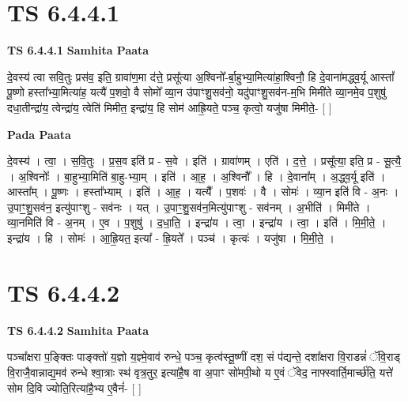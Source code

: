 \documentclass[17pt]{extarticle}
\begin{document}
\section*{ TS 6.4.4.1 }

\textbf{TS 6.4.4.1 } \newline
\textbf{Samhita Paata} \newline

दे॒वस्य॑ त्वा सवि॒तुः प्रस॑व॒ इति॒ ग्रावा॑ण॒मा द॑त्ते॒ प्रसू᳚त्या अ॒श्विनो᳚-र्बा॒हुभ्या॒मित्या॑हा॒श्विनौ॒ हि दे॒वाना॑मद्ध्व॒र्यू आस्तां᳚ पू॒ष्णो हस्ता᳚भ्या॒मित्या॑ह॒ यत्यै॑ प॒शवो॒ वै सोमो᳚ व्या॒न उ॑पाꣳशु॒सव॑नो॒ यदु॑पाꣳशु॒सव॑न-म॒भि मिमी॑ते व्या॒नमे॒व प॒शुषु॑ दधा॒तीन्द्रा॑य॒ त्वेन्द्रा॑य॒ त्वेति॑ मिमीत॒ इन्द्रा॑य॒ हि सोम॑ आह्रि॒यते॒ पञ्च॒ कृत्वो॒ यजु॑षा मिमीते॒- [  ] \newline

\textbf{Pada Paata} \newline

दे॒वस्य॑ । त्वा॒ । स॒वि॒तुः । प्र॒स॒व इति॑ प्र - स॒वे । इति॑ । ग्रावा॑णम् । एति॑ । द॒त्ते॒ । प्रसू᳚त्या॒ इति॒ प्र - सू॒त्यै॒ । अ॒श्विनोः᳚ । बा॒हुभ्या॒मिति॑ बा॒हु-भ्या॒म् । इति॑ । आ॒ह॒ । अ॒श्विनौ᳚ । हि । दे॒वाना᳚म् । अ॒द्ध्व॒र्यू इति॑ । आस्ता᳚म् । पू॒ष्णः । हस्ता᳚भ्याम् । इति॑ । आ॒ह॒ । यत्यै᳚ । प॒शवः॑ । वै । सोमः॑ । व्या॒न इति॑ वि - अ॒नः । उ॒पाꣳ॒॒शु॒सव॑न॒ इत्यु॑पाꣳशु - सव॑नः । यत् । उ॒पाꣳ॒॒शु॒सव॑न॒मित्यु॑पाꣳशु - सव॑नम् । अ॒भीति॑ । मिमी॑ते । व्या॒नमिति॑ वि - अ॒नम् । ए॒व । प॒शुषु॑ । द॒धा॒ति॒ । इन्द्रा॑य । त्वा॒ । इन्द्रा॑य । त्वा॒ । इति॑ । मि॒मी॒ते॒ । इन्द्रा॑य । हि । सोमः॑ । आ॒ह्रि॒यत॒ इत्या᳚ - ह्रि॒यते᳚ । पञ्च॑ । कृत्वः॑ । यजु॑षा । मि॒मी॒ते॒ ।  \newline




\section*{ TS 6.4.4.2 }

\textbf{TS 6.4.4.2 } \newline
\textbf{Samhita Paata} \newline

पञ्चा᳚क्षरा प॒ङ्क्तिः पाङ्क्तो॑ य॒ज्ञो य॒ज्ञ्मे॒वाव॑ रुन्धे॒ पञ्च॒ कृत्व॑स्तू॒ष्णीं दश॒ सं प॑द्यन्ते॒ दशा᳚क्षरा वि॒राडन्नं॑ ॅवि॒राड् वि॒राजै॒वान्नाद्य॒मव॑ रुन्धे श्वा॒त्राः स्थ॑ वृत्र॒तुर॒ इत्या॑है॒ष वा अ॒पाꣳ सो॑मपी॒थो य ए॒वं ॅवेद॒ नाफ्स्वार्ति॒मार्च्छ॑ति॒ यत्ते॑ सोम दि॒वि ज्योति॒रित्या॑है॒भ्य ए॒वैनं॑- [  ] \newline
\end{document}
